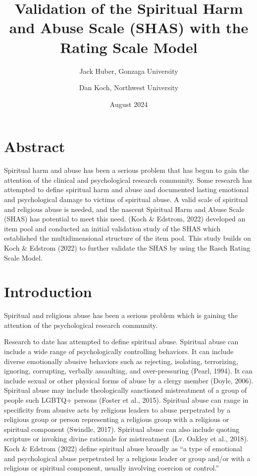 \documentclass[
  letterpaper,
]{article}
\title{Validation of the Spiritual Harm and Abuse Scale (SHAS) with the
Rating Scale Model}
\author{Jack Huber, Gonzaga University \and Dan Koch, Northwest
University}
\date{August 2024}
\renewcommand*\contentsname{Table of contents}
\newcommand\contentsname{Table of contents}
\begin{document}
\maketitle

\renewcommand*\contentsname{Table of contents}
{
\hypersetup{linkcolor=}
\setcounter{tocdepth}{2}
\tableofcontents
}


\chapter*{Abstract}\label{abstract}


Spiritual harm and abuse has been a serious problem that has begun to
gain the attention of the clinical and psychological research community.
Some research has attempted to define spiritual harm and abuse and
documented lasting emotional and psychological damage to victims of
spiritual abuse. A valid scale of spiritual and religious abuse is
needed, and the nascent Spiritual Harm and Abuse Scale (SHAS) has
potential to meet this need. (Koch \& Edstrom, 2022) developed an item
pool and conducted an initial validation study of the SHAS which
established the multidimensional structure of the item pool. This study
builds on Koch \& Edstrom (2022) to further validate the SHAS by using
the Rasch Rating Scale Model.


\chapter*{Introduction}\label{introduction}


Spiritual and religious abuse has been a serious problem which is
gaining the attention of the psychological research community.

Research to date has attempted to define spiritual abuse. Spiritual
abuse can include a wide range of psychologically controlling behaviors.
It can include diverse emotionally abusive behaviors such as rejecting,
isolating, terrorizing, ignoring, corrupting, verbally assaulting, and
over-pressuring (Pearl, 1994). It can include sexual or other physical
forms of abuse by a clergy member (Doyle, 2006). Spiritual abuse may
include theologically sanctioned mistreatment of a group of people such
LGBTQ+ persons (Foster et al., 2015). Spiritual abuse can range in
specificity from abusive acts by religious leaders to abuse perpetrated
by a religious group or person representing a religious group with a
religious or spiritual component (Swindle, 2017). Spiritual abuse can
also include quoting scripture or invoking divine rationale for
mistreatment (Lv. Oakley et al., 2018). Koch \& Edstrom (2022) define
spiritual abuse broadly as ``a type of emotional and psychological abuse
perpetrated by a religious leader or group and/or with a religious or
spiritual component, usually involving coercion or control.''
\end{document}
